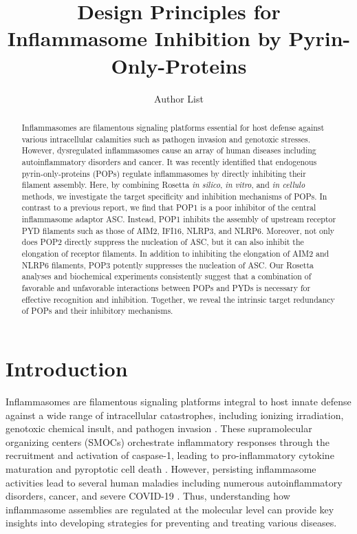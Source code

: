\documentclass[11pt]{article}
\title{Design Principles for Inflammasome Inhibition by Pyrin-Only-Proteins}
\author{Author List}
\date{}
\begin{document}
\maketitle

\begin{abstract}
Inflammasomes are filamentous signaling platforms essential for host defense against various intracellular calamities such as pathogen invasion and genotoxic stresses. However, dysregulated inflammasomes cause an array of human diseases including autoinflammatory disorders and cancer. It was recently identified that endogenous pyrin-only-proteins (POPs) regulate inflammasomes by directly inhibiting their filament assembly. Here, by combining Rosetta \textit{in silico}, \textit{in vitro}, and \textit{in cellulo} methods, we investigate the target specificity and inhibition mechanisms of POPs. In contrast to a previous report, we find that POP1 is a poor inhibitor of the central inflammasome adaptor ASC. Instead, POP1 inhibits the assembly of upstream receptor PYD filaments such as those of AIM2, IFI16, NLRP3, and NLRP6. Moreover, not only does POP2 directly suppress the nucleation of ASC, but it can also inhibit the elongation of receptor filaments. In addition to inhibiting the elongation of AIM2 and NLRP6 filaments, POP3 potently suppresses the nucleation of ASC. Our Rosetta analyses and biochemical experiments consistently suggest that a combination of favorable and unfavorable interactions between POPs and PYDs is necessary for effective recognition and inhibition. Together, we reveal the intrinsic target redundancy of POPs and their inhibitory mechanisms.
\end{abstract}

\section{Introduction}

Inflammasomes are filamentous signaling platforms integral to host innate defense against a wide range of intracellular catastrophes, including ionizing irradiation, genotoxic chemical insult, and pathogen invasion \citep{broz2016inflammasomes,kagan2014smocs}. These supramolecular organizing centers (SMOCs) orchestrate inflammatory responses through the recruitment and activation of caspase-1, leading to pro-inflammatory cytokine maturation and pyroptotic cell death \citep{lu2015structural}. However, persisting inflammasome activities lead to several human maladies including numerous autoinflammatory disorders, cancer, and severe COVID-19 \citep{karki2017inflammasomes}. Thus, understanding how inflammasome assemblies are regulated at the molecular level can provide key insights into developing strategies for preventing and treating various diseases.
\end{document}
